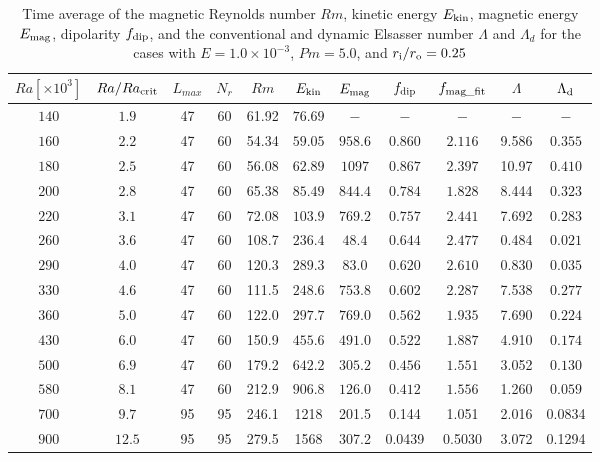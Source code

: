 \begin{table}
\caption{Time average of the magnetic Reynolds number $Rm$, kinetic energy $E_{\rm kin}$, magnetic energy $E_{\rm mag}$, dipolarity $f_{\rm dip}$, and {\color{red} the conventional and dynamic Elsasser number $\Lambda$ and $\Lambda_{d}$ for the cases with $E = 1.0 \times 10^{-3}$, $Pm = 5.0$, and} $r_{\rm i}/r_{\rm o} = 0.25$}
  \begin{tabular}{ccccccccccc}
    \hline
     $Ra[\times 10^3]$  &  $Ra/Ra_{\rm crit}$& 
     {\color{red} $L_{max}$} & {\color{red} $N_{r}$} & {\color{red} $Rm$} & $E_{\rm kin}$  &  $E_{\rm mag}$ & $f_{\rm dip}$ & $f_{\rm mag\_fit}$ & $\Lambda$ & $\Lambda_{\rm d}$\\
    \hline 
    $140$  & $1.9$ & 47 & 60 & 61.92 &  $76.69$ & $-$ & $-$ & $-$ & $-$ & $-$\\
    $160$  & $2.2$ & 47 & 60 & 54.34 &  $59.05$ & $958.6$ & $0.860$ & $2.116$ & 9.586 & $0.355$\\
    $180$  & $2.5$ & 47 & 60 & 56.08 &  $62.89$ & $1097$ & $0.867$ & $2.397$ & 10.97 & $0.410$\\
    $200$  & $2.8$ & 47 & 60 & 65.38 &  $85.49$ & $844.4$ & $0.784$ & $1.828$ & 8.444 & $0.323$\\
    $220$  & $3.1$ & 47 & 60 & 72.08 &  $103.9$ & $769.2$ & $0.757$ & $2.441$ & 7.692 & $0.283$\\
    $260$  & $3.6$ & 47 & 60 & 108.7 &  $236.4$ & $48.4$ & $0.644$ & $2.477$ & 0.484 & $0.021$\\
    $290$  & $4.0$ & 47 & 60 & 120.3 &  $289.3$ & $83.0$ & $0.620$ & $2.610$ & 0.830 & $0.035$\\
    $330$  & $4.6$ & 47 & 60 & 111.5 &  $248.6$ & $753.8$ & $0.602$ & $2.287$ & 7.538 & $0.277$\\
    $360$  & $5.0$ & 47 & 60 & 122.0 &  $297.7$ & $769.0$ & $0.562$ & $1.935$ & 7.690 & $0.224$\\
    $430$  & $6.0$ & 47 & 60 & 150.9 &  $455.6$ & $491.0$ & $0.522$ & $1.887$ & 4.910 & $0.174$\\
    $500$  & $6.9$ & 47 & 60 & 179.2 &  $642.2$ & $305.2$ & $0.456$ & $1.551$ & 3.052 & $0.130$\\
    $580$  & $8.1$ & 47 & 60 & 212.9 &  $906.8$ & $126.0$ & $0.412$ & $1.556$ & 1.260 & $0.059$\\
    $700$  & $9.7$ & 95 & 95 & 246.1 &  1218 & 201.5 & 0.144 & 1.051 & 2.016 & 0.0834 \\
    $900$  & $12.5$ & 95 & 95 & 279.5 &  1568 & 307.2 & 0.0439 & 0.5030 & 3.072 & 0.1294 \\
    \hline
  \end{tabular}
 \label{table:Summary_25}
\end{table}
 
